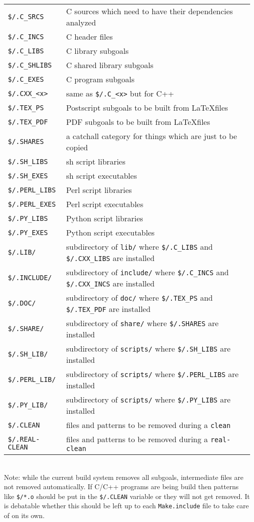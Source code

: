 \documentclass[letterpaper]{article}
\begin{document}
\begin{tabular}{ll}
\verb+$/.C_SRCS+ & C sources which need to have their dependencies analyzed\\
\verb+$/.C_INCS+ & C header files\\
\verb+$/.C_LIBS+ & C library subgoals\\
\verb+$/.C_SHLIBS+ & C shared library subgoals\\
\verb+$/.C_EXES+ & C program subgoals\\
\verb+$/.CXX_<x>+ & same as \verb+$/.C_<x>+ but for C++\\
\verb+$/.TEX_PS+ & Postscript subgoals to be built from \LaTeX files\\
\verb+$/.TEX_PDF+ & PDF subgoals to be built from \LaTeX files\\
\verb+$/.SHARES+  & a catchall category for things which are just to be copied\\
\verb+$/.SH_LIBS+ & sh script libraries\\
\verb+$/.SH_EXES+ & sh script executables\\
\verb+$/.PERL_LIBS+ & Perl script libraries\\
\verb+$/.PERL_EXES+ & Perl script executables\\
\verb+$/.PY_LIBS+ & Python script libraries\\
\verb+$/.PY_EXES+ & Python script executables\\
\verb+$/.LIB/+  & subdirectory of \verb+lib/+ where \verb+$/.C_LIBS+ and \verb+$/.CXX_LIBS+ are installed\\
\verb+$/.INCLUDE/+  & subdirectory of \verb+include/+ where \verb+$/.C_INCS+ and \verb+$/.CXX_INCS+ are installed\\
\verb+$/.DOC/+  & subdirectory of \verb+doc/+ where \verb+$/.TEX_PS+ and \verb+$/.TEX_PDF+ are installed\\
\verb+$/.SHARE/+  & subdirectory of \verb+share/+ where \verb+$/.SHARES+ are installed\\
\verb+$/.SH_LIB/+  & subdirectory of \verb+scripts/+ where \verb+$/.SH_LIBS+ are installed\\
\verb+$/.PERL_LIB/+  & subdirectory of \verb+scripts/+ where \verb+$/.PERL_LIBS+ are installed\\
\verb+$/.PY_LIB/+  & subdirectory of \verb+scripts/+ where \verb+$/.PY_LIBS+ are installed\\
\verb+$/.CLEAN+ & files and patterns to be removed during a \verb+clean+\\
\verb+$/.REAL-CLEAN+ & files and patterns to be removed during a \verb+real-clean+\\
\end{tabular}\\
Note: while the current build system removes all subgoals, intermediate
files are not removed automatically.  If C/C++ programs are being build
then patterns like \verb+$/*.o+ should be put in the \verb+$/.CLEAN+ variable
or they will not get removed.  It is debatable whether this should be left
up to each \verb+Make.include+ file to take care of on its own.
\end{document}
